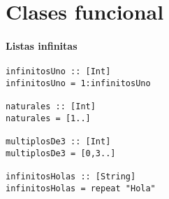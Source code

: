 \section{Clases funcional}
\paragraph{Listas infinitas}
\begin{centrado}
	\begin{verbatim}
infinitosUno :: [Int]
infinitosUno = 1:infinitosUno

naturales :: [Int]
naturales = [1..]
		
multiplosDe3 :: [Int]
multiplosDe3 = [0,3..]
		
infinitosHolas :: [String]
infinitosHolas = repeat "Hola"
	\end{verbatim}
\end{centrado}
